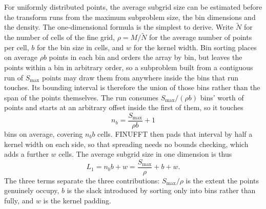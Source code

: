 For uniformly distributed points, the average subgrid size can be estimated before the transform runs from the maximum subproblem size, the bin dimensions and the density. The one-dimensional formula is the simplest to derive. Write $\tilde{N}$ for the number of cells of the fine grid, $\rho = M/\tilde{N}$ for the average number of points per cell, $b$ for the bin size in cells, and $w$ for the kernel width. Bin sorting places on average $\rho b$ points in each bin and orders the array by bin, but leaves the points within a bin in arbitrary order, so a subproblem built from a contiguous run of $S_{\max}$ points may draw them from anywhere inside the bins that run touches. Its bounding interval is therefore the union of those bins rather than the span of the points themselves. The run consumes $S_{\max} / (\rho b)$ bins' worth of points and starts at an arbitrary offset inside the first of them, so it touches
\begin{equation}
    n_b = \frac{S_{\max}}{\rho b} + 1
    \label{eq:subgrid_bins}
\end{equation}
bins on average, covering $n_b b$ cells. FINUFFT then pads that interval by half a kernel width on each side, so that spreading needs no bounds checking, which adds a further $w$ cells. The average subgrid size in one dimension is thus
\begin{equation}
    L_1 = n_b b + w = \frac{S_{\max}}{\rho} + b + w.
    \label{eq:subgrid_1d}
\end{equation}
The three terms separate the three contributions: $S_{\max}/\rho$ is the extent the points genuinely occupy, $b$ is the slack introduced by sorting only into bins rather than fully, and $w$ is the kernel padding. 

